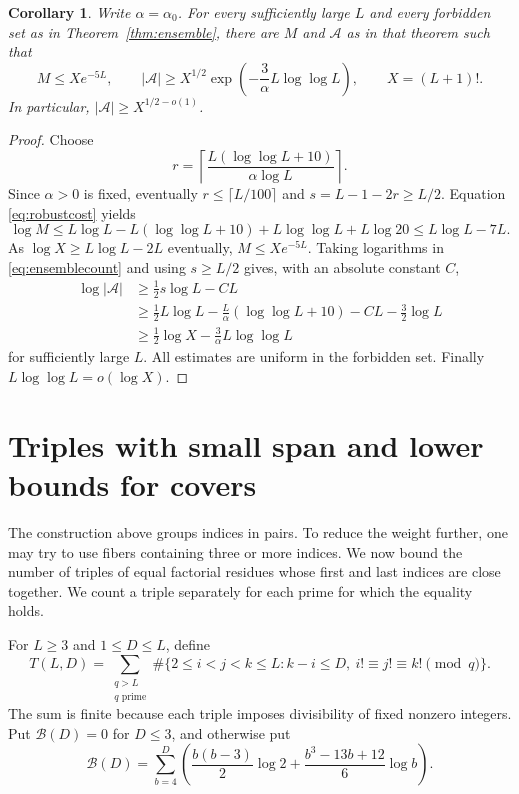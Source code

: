 \documentclass[11pt]{amsart}
\newtheorem{corollary}[theorem]{Corollary}
\theoremstyle{definition}
\theoremstyle{remark}
\begin{document}
\begin{corollary}\label{cor:halfensemble}
Write $\alpha=\alpha_0$. For every sufficiently large $L$ and every
forbidden set as in Theorem~\ref{thm:ensemble}, there are $M$ and
$\mathcal A$ as in that theorem such that
\[
M\leq Xe^{-5L},\qquad
|\mathcal A|\geq X^{1/2}
\exp\left(-\frac3\alpha L\log\log L\right),\qquad X=(L+1)!.
\]
In particular, $|\mathcal A|\geq X^{1/2-o(1)}$.
\end{corollary}
\begin{proof}
Choose
\[
r=\left\lceil\frac{L(\log\log L+10)}{\alpha\log L}\right\rceil.
\]
Since $\alpha>0$ is fixed, eventually $r\leq\lceil L/100\rceil$ and
$s=L-1-2r\geq L/2$. Equation \eqref{eq:robustcost} yields
\[
\log M\leq L\log L-L(\log\log L+10)+L\log\log L+L\log20
\leq L\log L-7L.
\]
As $\log X\geq L\log L-2L$ eventually, $M\leq Xe^{-5L}$.
Taking logarithms in \eqref{eq:ensemblecount} and using $s\geq L/2$
gives, with an absolute constant $C$,
\[
\begin{aligned}
\log|\mathcal A|
&\geq\tfrac12s\log L-CL\\
&\geq\tfrac12L\log L-
\frac{L}{\alpha}(\log\log L+10)-CL-\tfrac32\log L\\
&\geq\tfrac12\log X-\frac3\alpha L\log\log L
\end{aligned}
\]
for sufficiently large $L$. All estimates are uniform in the forbidden
set. Finally $L\log\log L=o(\log X)$.
\end{proof}
\section{Triples with small span and lower bounds for covers}\label{sec:locality}

The construction above groups indices in pairs. To reduce the weight
further, one may try to use fibers containing three or more indices.
We now bound the number of triples of equal factorial residues whose
first and last indices are close together. We count a triple separately
for each prime for which the equality holds.

For $L\geq3$ and $1\leq D\leq L$, define
\[
T(L,D)=\sum_{\substack{q>L\\q\text{ prime}}}
\#\{2\leq i<j<k\leq L:k-i\leq D,\ i!\equiv j!\equiv k!\pmod q\}.
\]
The sum is finite because each triple imposes divisibility of fixed
nonzero integers. Put $\mathcal B(D)=0$ for $D\leq3$, and otherwise put
\begin{equation}\label{eq:resultantbudget}
\mathcal B(D)=\sum_{b=4}^D
\left(\frac{b(b-3)}2\log2+
\frac{b^3-13b+12}{6}\log b\right).
\end{equation}
\end{document}
